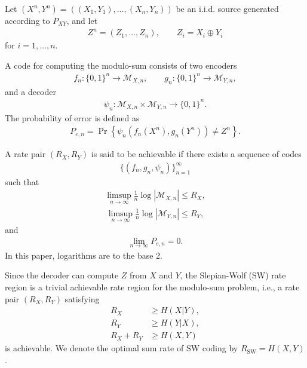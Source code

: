 \documentclass[journal,onecolumn]{IEEEtran}
\theoremstyle{definition}
\theoremstyle{remark}
\begin{document}
Let $(X^n,Y^n)=((X_1,Y_1),\ldots,(X_n,Y_n))$ be an i.i.d. source generated according to $P_{XY}$, and let
\begin{align*}
    Z^n=(Z_1,\ldots,Z_n), \qquad Z_i=X_i\oplus Y_i
\end{align*}
for $i=1,\ldots,n$.

A code for computing the modulo-sum consists of two encoders
\begin{align*}
    f_n:\{0,1\}^n\to \mathcal{M}_{X,n},
    \qquad
    g_n:\{0,1\}^n\to \mathcal{M}_{Y,n},
\end{align*}
and a decoder
\begin{align*}
    \psi_n:\mathcal{M}_{X,n}\times \mathcal{M}_{Y,n}
    \to \{0,1\}^n .
\end{align*}
The probability of error is defined as
\begin{align*}
    P_{e,n}
    =
    \Pr\left\{
        \psi_n(f_n(X^n),g_n(Y^n))\neq Z^n
    \right\}.
\end{align*}

A rate pair $(R_X,R_Y)$ is said to be achievable if there exists
a sequence of codes
\begin{align*}
    \{(f_n,g_n,\psi_n)\}_{n=1}^{\infty}
\end{align*}
such that
\begin{align*}
    \limsup_{n\to\infty}\frac{1}{n}\log|\mathcal{M}_{X,n}|
    \leq R_X,
\end{align*}
\begin{align*}
    \limsup_{n\to\infty}\frac{1}{n}\log|\mathcal{M}_{Y,n}|
    \leq R_Y,
\end{align*}
and
\begin{align*}
    \lim_{n\to\infty}P_{e,n}=0.
\end{align*}
In this paper, logarithms are to the base 2.

Since the decoder can compute $Z$ from $X$ and $Y$, the Slepian-Wolf (SW) rate region is a trivial achievable rate region for the modulo-sum problem, i.e., a rate pair $(R_X,R_Y)$ satisfying
\begin{equation}
    \begin{aligned}\label{rate:SW}
            R_X &\geq H(X|Y),\\
            R_Y &\geq H(Y|X),\\
            R_X + R_Y &\geq H(X,Y)
        \end{aligned}
\end{equation}        
is achievable.
We denote the optimal sum rate of SW coding by $R_{\mathrm{SW}}=H(X,Y)$.
\end{document}
